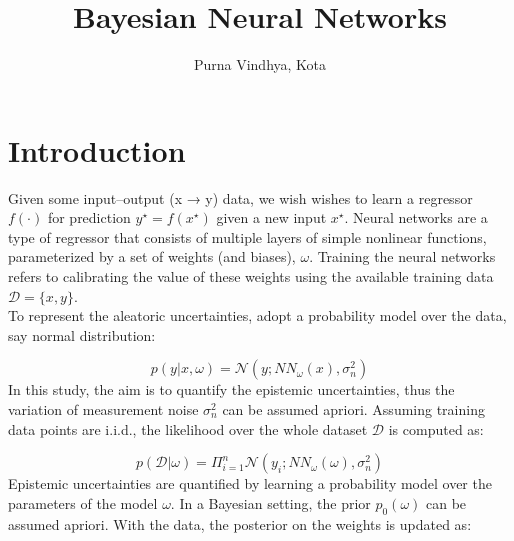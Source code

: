 \documentclass[11pt,a4paper]{article}
\begin{document}
\title{Bayesian Neural Networks}
\date{}
\author{Purna Vindhya, Kota}
\maketitle




\section{Introduction}

Given some input–output (x → y) data, we wish wishes to learn a regressor $f(\cdot)$ for prediction $y^{\star} = f(x^{\star})$ given a new input $x^{\star}$. Neural networks are a type of regressor that consists of multiple layers of simple nonlinear functions, parameterized by a set of weights (and biases), $\omega$. Training the neural networks refers to calibrating the value of these weights using the available training data $\mathcal{D} = \{x,y\}$. \\
To represent the aleatoric uncertainties, adopt a probability model over the data, say normal distribution:

\begin{equation}
    p(y|x, \omega) = \mathcal{N}(y; NN_{\omega}(x), \sigma_n ^2) \label{eq:1}
\end{equation}
In this study, the aim is to quantify the epistemic uncertainties, thus the variation of measurement noise $\sigma_n ^2$ can be assumed apriori. Assuming training data points are i.i.d., the likelihood over the whole dataset $\mathcal{D}$ is computed as:

\begin{equation}
    p(\mathcal{D}|\omega) = \Pi_{i=1}^{n} \mathcal{N}(y_i ; NN_{\omega}(\omega), \sigma_n ^2)
\end{equation}
Epistemic uncertainties are quantified by learning a probability model over the parameters of the model $\omega$. In a Bayesian setting, the prior $p_0(\omega)$ can be assumed apriori. With the data, the posterior on the weights is updated as:
\end{document}
